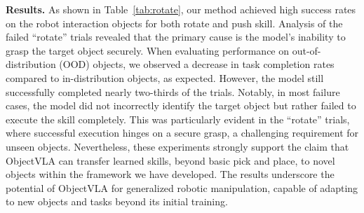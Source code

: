 \noindent
\textbf{Results.} As shown in Table~\ref{tab:rotate}, our method achieved high success rates on the robot interaction objects for both rotate and push skill. Analysis of the failed ``rotate'' trials revealed that the primary cause is the model's inability to grasp the target object securely. When evaluating performance on out-of-distribution (OOD) objects, we observed a decrease in task completion rates compared to in-distribution objects, as expected. However, the model still successfully completed nearly two-thirds of the trials. Notably, in most failure cases, the model did not incorrectly identify the target object but rather failed to execute the skill completely. This was particularly evident in the ``rotate'' trials, where successful execution hinges on a secure grasp, a challenging requirement for unseen objects. Nevertheless, these experiments strongly support the claim that ObjectVLA can transfer learned skills, beyond basic pick and place, to novel objects within the framework we have developed. The results underscore the potential of ObjectVLA for generalized robotic manipulation, capable of adapting to new objects and tasks beyond its initial training.


